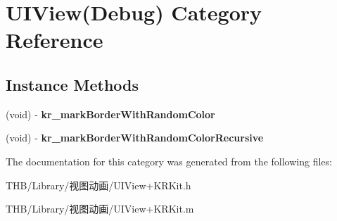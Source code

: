 \hypertarget{category_u_i_view_07_debug_08}{}\section{U\+I\+View(Debug) Category Reference}
\label{category_u_i_view_07_debug_08}
\subsection*{Instance Methods}
\begin{DoxyCompactItemize}
\item 
\mbox{\label{category_u_i_view_07_debug_08_a17fc6e9b50a5b06b64dec5f84bb69ca1}} 
(void) -\/ {\bfseries kr\+\_\+mark\+Border\+With\+Random\+Color}
\item 
\mbox{\label{category_u_i_view_07_debug_08_a4a1a09e232ae29a5045bb6164a39c0ae}} 
(void) -\/ {\bfseries kr\+\_\+mark\+Border\+With\+Random\+Color\+Recursive}
\end{DoxyCompactItemize}


The documentation for this category was generated from the following files\+:\begin{DoxyCompactItemize}
\item 
T\+H\+B/\+Library/视图动画/U\+I\+View+\+K\+R\+Kit.\+h\item 
T\+H\+B/\+Library/视图动画/U\+I\+View+\+K\+R\+Kit.\+m\end{DoxyCompactItemize}
